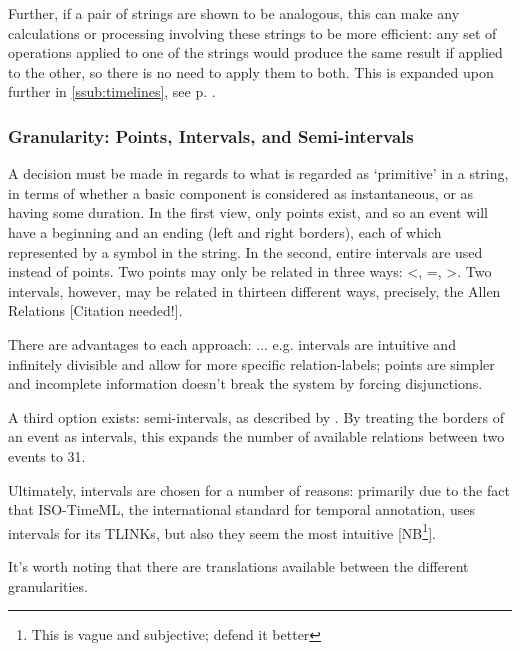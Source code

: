 \documentclass[a4paper,12pt,leqno]{article}
\newcommand{\citeneeded}[1][]{{\color{red}[Citation needed!#1]}}
\newcommand{\selfnote}[1]{{\color{red}[NB\footnote{{\color{red}#1}}]}}
\newcommand{\nb}{\selfnote}
\begin{document}
Further, if a pair of strings are shown to be analogous, this can make any calculations or processing involving these strings to be more efficient: any set of operations applied to one of the strings would produce the same result if applied to the other, so there is no need to apply them to both. This is expanded upon further in \cref{ssub:timelines}, see p. \pageref{ex:sp-analogy}.

\subsubsection{Granularity: Points, Intervals, and Semi-intervals}\label{ssub:granularity}


A decision must be made in regards to what is regarded as `primitive' in a string, in terms of whether a basic component is considered as instantaneous, or as having some duration. In the first view, only points exist, and so an event will have a beginning and an ending (left and right borders), each of which represented by a symbol in the string. In the second, entire intervals are used instead of points. Two points may only be related in three ways: \textless, =, \textgreater. Two intervals, however, may be related in thirteen different ways, precisely, the Allen Relations \citeneeded{}. 

There are advantages to each approach: ... e.g. intervals are intuitive and infinitely divisible and allow for more specific relation-labels; points are simpler and incomplete information doesn't break the system by forcing disjunctions.

A third option exists: semi-intervals, as described by \cite{Freksa1992}. By treating the borders of an event as intervals, this expands the number of available relations between two events to 31.

Ultimately, intervals are chosen for a number of reasons: primarily due to the fact that ISO-TimeML, the international standard for temporal annotation, uses intervals for its TLINKs, but also they seem the most intuitive \nb{This is vague and subjective; defend it better}.

It's worth noting that there are translations available between the different granularities.
\end{document}
